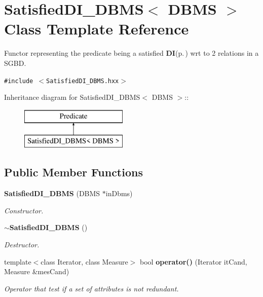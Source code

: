 \section{Satisfied\-DI\_\-DBMS$<$ DBMS $>$ Class Template Reference}
\label{class_satisfied_d_i___d_b_m_s}
Functor representing the predicate being a satisfied {\bf DI}{\rm (p.\,\pageref{class_d_i})} wrt to 2 relations in a SGBD.  


{\tt \#include $<$Satisfied\-DI\_\-DBMS.hxx$>$}

Inheritance diagram for Satisfied\-DI\_\-DBMS$<$ DBMS $>$::\begin{figure}[H]
\begin{center}
\leavevmode
\includegraphics[height=2cm]{class_satisfied_d_i___d_b_m_s}
\end{center}
\end{figure}
\subsection*{Public Member Functions}
\begin{CompactItemize}
\item 
{\bf Satisfied\-DI\_\-DBMS} (DBMS $\ast$in\-Dbms)
\begin{CompactList}\small\item\em Constructor. \item\end{CompactList}\item 
{\bf $\sim$Satisfied\-DI\_\-DBMS} ()\label{class_satisfied_d_i___d_b_m_s_e6cef90edd88ec5a13be29269945fd9e}

\begin{CompactList}\small\item\em Destructor. \item\end{CompactList}\item 
template$<$class Iterator, class Measure$>$ bool {\bf operator()} (Iterator it\-Cand, Measure \&mes\-Cand)\label{class_satisfied_d_i___d_b_m_s_efb01db076df9568ddfcd7b7355ea733}

\begin{CompactList}\small\item\em Operator that test if a set of attributes is not redundant. \item\end{CompactList}\end{CompactItemize}
